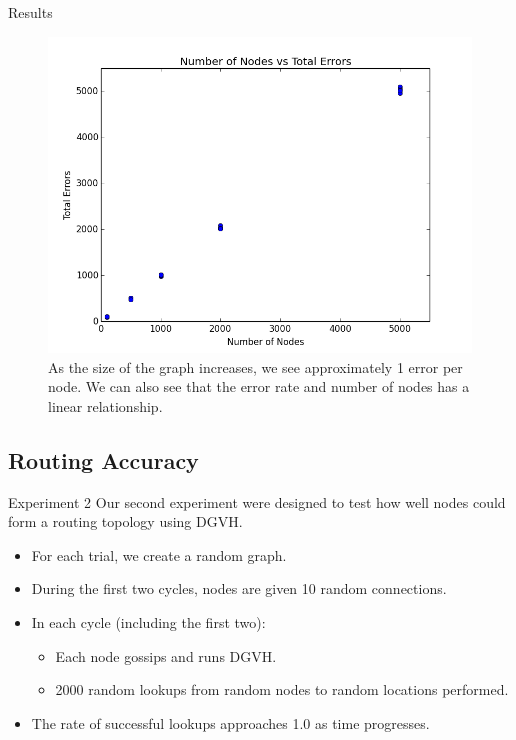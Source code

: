 \documentclass[8pt]{beamer}
\begin{document}
\begin{frame}{Results}
\begin{figure}
	\centering
	\includegraphics[width=0.5\linewidth]{error_rate}
	\caption{As the size of the graph increases, we see approximately 1 error per node.
	We can also see that the error rate and number of nodes has a linear relationship.}
	\label{exp_0}
\end{figure}
\end{frame}

\subsection{Routing Accuracy}


\begin{frame}{Experiment 2}
Our second experiment were designed to test how well nodes could form a routing topology using DGVH.

\begin{itemize}
	\item For each trial, we create a random graph.
	\item During the first two cycles, nodes are given 10 random connections.
	\item In each cycle (including the first two):
	\begin{itemize}
		\item Each node gossips and runs DGVH.
		\item 2000 random lookups from random nodes to random locations performed.
	\end{itemize}
	\item The rate of successful lookups approaches 1.0 as time progresses.
\end{itemize}
\end{frame}
\end{document}
